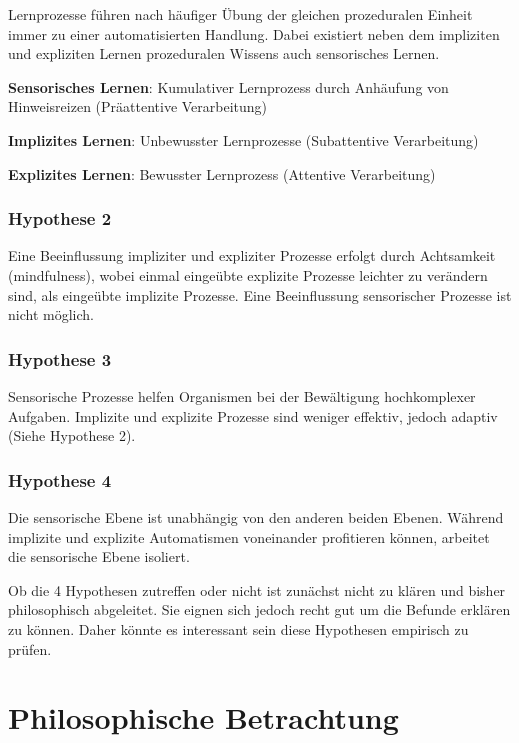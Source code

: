 \documentclass[doc,a4paper,12pt]{apa6}
\begin{document}
Lernprozesse führen nach häufiger Übung der gleichen prozeduralen Einheit immer zu einer automatisierten Handlung. Dabei existiert neben dem impliziten und expliziten Lernen prozeduralen Wissens auch sensorisches Lernen.

\begin{compactitem}
  \item \textbf{Sensorisches Lernen}: Kumulativer Lernprozess durch Anhäufung von Hinweisreizen (Präattentive Verarbeitung)
  \item \textbf{Implizites Lernen}: Unbewusster Lernprozesse (Subattentive Verarbeitung)
  \item \textbf{Explizites Lernen}: Bewusster Lernprozess (Attentive Verarbeitung)
\end{compactitem}

\subsubsection{Hypothese 2}

Eine Beeinflussung impliziter und expliziter Prozesse erfolgt durch Achtsamkeit (mindfulness), wobei einmal eingeübte explizite Prozesse leichter zu verändern sind, als eingeübte implizite Prozesse. Eine Beeinflussung sensorischer Prozesse ist nicht möglich.

\subsubsection{Hypothese 3}

Sensorische Prozesse helfen Organismen bei der Bewältigung hochkomplexer Aufgaben. Implizite und explizite Prozesse sind weniger effektiv, jedoch adaptiv (Siehe Hypothese 2).

\subsubsection{Hypothese 4}

Die sensorische Ebene ist unabhängig von den anderen beiden Ebenen. Während implizite und explizite Automatismen voneinander profitieren können, arbeitet die sensorische Ebene isoliert.

Ob die 4 Hypothesen zutreffen oder nicht ist zunächst nicht zu klären und bisher philosophisch abgeleitet. Sie eignen sich jedoch recht gut um die Befunde erklären zu können. Daher könnte es interessant sein diese Hypothesen empirisch zu prüfen.

\section{Philosophische Betrachtung}
\end{document}
